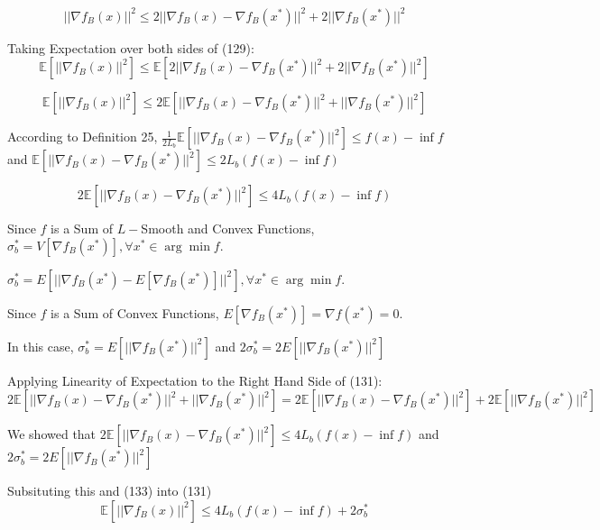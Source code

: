 \begin{equation}
    ||\nabla f_B(x)||^2 \leq 2||\nabla f_B(x) - \nabla f_B(x^*)||^2 + 2||\nabla f_B(x^*)||^2
\end{equation}

\noindent Taking Expectation over both sides of (129): 
\begin{equation}
    \mathbb{E}[||\nabla f_B(x)||^2] \leq \mathbb{E} [2||\nabla f_B(x) - \nabla f_B(x^*)||^2 + 2||\nabla f_B(x^*)||^2]
\end{equation}

\begin{equation}
    \mathbb{E}[||\nabla f_B(x)||^2] \leq 2\mathbb{E} [||\nabla f_B(x) - \nabla f_B(x^*)||^2 + ||\nabla f_B(x^*)||^2]
\end{equation}

\noindent According to Definition 25, $\frac{1}{2L_{b}} \mathbb{E}[||\nabla f_B(x) - \nabla f_B(x^*)||^2] \leq f(x) - \inf f$ and $\mathbb{E}[||\nabla f_B(x) - \nabla f_B(x^*)||^2] \leq 2L_b (f(x) - \inf f)$ \newline 

\begin{equation}
    2\mathbb{E}[||\nabla f_B(x) - \nabla f_B(x^*)||^2] \leq 4L_b (f(x) - \inf f)
\end{equation}

\noindent  Since $f$ is a Sum of $L-$Smooth and Convex Functions, $\sigma_b^* = V[\nabla f_B(x^*)], \forall x^* \in \arg \min f.$ \newline 

\noindent $\sigma_b^* = E[||\nabla f_B(x^*) - E[\nabla f_B(x^*)]||^2], \forall x^* \in \arg \min f.$ \newline 

\noindent Since $f$ is a Sum of Convex Functions, $E[\nabla f_B(x^*)] = \nabla f(x^*) = 0$. \newline 

\noindent In this case, $\sigma_b^* = E[||\nabla f_B(x^*)||^2]$ and $2 \sigma_b^* = 2 E[||\nabla f_B(x^*)||^2]$ \newline 

\noindent Applying Linearity of Expectation to the Right Hand Side of (131):
\begin{equation}
    2\mathbb{E} [||\nabla f_B(x) - \nabla f_B(x^*)||^2 + ||\nabla f_B(x^*)||^2] = 2\mathbb{E} [||\nabla f_B(x) - \nabla f_B(x^*)||^2] + 2 \mathbb{E}  [||\nabla f_B(x^*)||^2]
\end{equation}


\noindent We showed that $2\mathbb{E}[||\nabla f_B(x) - \nabla f_B(x^*)||^2] \leq 4L_{b} (f(x) - \inf f)$ and $2 \sigma_b^* = 2 E[||\nabla f_B(x^*)||^2]$ \newline 

\noindent Subsituting this and (133) into (131)
\begin{equation}
    \mathbb{E}[||\nabla f_B(x)||^2] \leq 4L_{b} (f(x) - \inf f) + 2 \sigma_b^*
\end{equation}
